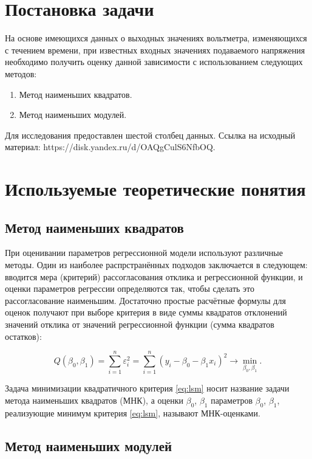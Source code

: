 \documentclass[12pt]{article}
\begin{document}
\tableofcontents\newpage

\section{Постановка задачи}

На основе имеющихся данных о выходных значениях вольтметра, изменяющихся с течением времени, при известных входных значениях подаваемого напряжения необходимо получить оценку данной зависимости с использованием следующих методов:
\begin{enumerate}
    \item Метод наименьших квадратов.
    \item Метод наименьших модулей.
\end{enumerate}
Для исследования предоставлен шестой столбец данных. Ссылка на исходный материал: https://disk.yandex.ru/d/OAQgCulS6NfbOQ.
\section{Используемые теоретические понятия}
\subsection{Метод наименьших квадратов}
При оценивании параметров регрессионной модели используют различные
методы. Один из наиболее распрстранённых подходов заключается в
следующем: вводится мера (критерий) рассогласования отклика и
регрессионной функции, и оценки параметров регрессии определяются так,
чтобы сделать это рассогласование наименьшим. Достаточно простые
расчётные формулы для оценок получают при выборе критерия в виде суммы
квадратов отклонений значений отклика от значений регрессионной функции
(сумма квадратов остатков):

\begin{equation} \label{eq:lsm}
    Q(\beta_0, \beta_1) = \sum \limits_{i=1}^n \varepsilon_i^2 =
    \sum \limits_{i=1}^n (y_i - \beta_0 - \beta_1 x_i)^2 \rightarrow
    \min_{\beta_0, \beta_1}.
\end{equation}

Задача минимизации квадратичного критерия \eqref{eq:lsm} носит название
задачи метода наименьших квадратов (МНК), а оценки \( \beta_0 \),
\( \beta_1 \) параметров \( \beta_0 \), \( \beta_1 \), реализующие минимум
критерия \eqref{eq:lsm}, называют МНК-оценками.

\subsection{Метод наименьших модулей}
\end{document}
